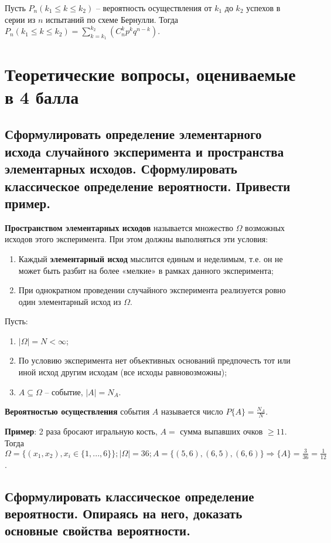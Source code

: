 Пусть $P_n(k_1 \leq k \leq k_2)$ -- вероятность осуществления от $k_1$ до $k_2$ успехов в серии из $n$ испытаний по схеме Бернулли. Тогда $P_n(k_1 \leq k \leq k_2) = \sum_{k = k_1}^{k_2} (C_n^k p^k q^{n-k})$.

\chapter{Теоретические вопросы, оцениваемые в 4 балла}

\section{Сформулировать определение элементарного исхода случайного эксперимента и пространства элементарных исходов. Сформулировать классическое определение вероятности. Привести пример.}

\textbf{Пространством элементарных исходов} называется множество $\Omega$ возможных исходов этого эксперимента. При этом должны выполняться эти условия:
\begin{enumerate}
	\item Каждый \textbf{элементарный исход} мыслится единым и неделимым, т.е. он не может быть разбит на более «мелкие» в рамках данного эксперимента;
	\item При однократном проведении случайного эксперимента реализуется ровно один элементарный исход из $\Omega$.
\end{enumerate}

Пусть:
\begin{enumerate}
	\item $|\Omega| = N < \infty$;
	\item По условию эксперимента нет объективных оснований предпочесть тот или иной исход другим исходам (все исходы равновозможны);
	\item $A \subseteq \Omega$ -- событие, $|A| = N_A$.
\end{enumerate}

\textbf{Вероятностью осуществления} события $A$ называется число $P\{A\} = \frac{N_A}{N}$.

\textbf{Пример}: 2 раза бросают игральную кость, $A=$ {сумма выпавших очков $\geq 11$}. Тогда $\Omega  = \{(x_1, x_2), x_i \in \{1, ..., 6\}\}; |\Omega| = 36; A = \{(5, 6), (6, 5), (6, 6)\} \Rightarrow \{A\} = \frac{3}{36} = \frac{1}{12}$.


\section{Сформулировать классическое определение вероятности. Опираясь на него, доказать основные свойства вероятности.}

